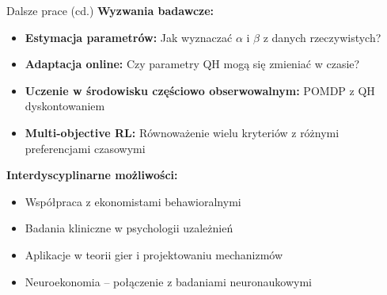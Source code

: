 \begin{frame}{Dalsze prace (cd.)}
\textbf{Wyzwania badawcze:}

\begin{itemize}
    \item \textbf{Estymacja parametrów:} Jak wyznaczać $\alpha$ i $\beta$ z danych rzeczywistych?
    \item \textbf{Adaptacja online:} Czy parametry QH mogą się zmieniać w czasie?
    \item \textbf{Uczenie w środowisku częściowo obserwowalnym:} POMDP z QH dyskontowaniem
    \item \textbf{Multi-objective RL:} Równoważenie wielu kryteriów z różnymi preferencjami czasowymi
\end{itemize}

\vspace{0.5em}
\textbf{Interdyscyplinarne możliwości:}
\begin{itemize}
    \item Współpraca z ekonomistami behawioralnymi
    \item Badania kliniczne w psychologii uzależnień
    \item Aplikacje w teorii gier i projektowaniu mechanizmów
    \item Neuroekonomia -- połączenie z badaniami neuronaukowymi
\end{itemize}
\end{frame}

